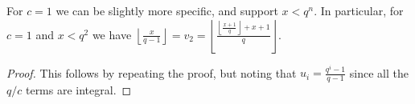 \begin{corollary}
   For $c=1$ we can be slightly more specific, and support $x < q^n$.
   In particular, for $c=1$ and $x < q^2$ we have
   $
   \left\lfloor\frac{x}{q-1}\right\rfloor
   = v_2
   = \left\lfloor\frac{\left\lfloor\frac{x+1}{q}\right\rfloor+x+1}{q}\right\rfloor
   $.
\end{corollary}
\begin{proof}
   This follows by repeating the proof, but noting that $u_i = \frac{q^i-1}{q-1}$ since all the $q/c$ terms are integral.
\end{proof}
